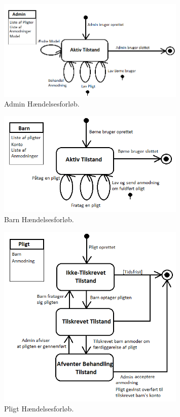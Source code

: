 \begin{figure}[H]
\centering
\includegraphics[width=0.8\textwidth]{Billeder/ForaelderForloeb.png}
\caption{Admin Hændelsesforløb.}
\label{ForaelderHaendelsesforloeb}
\end{figure}

\begin{figure}[H]
\centering
\includegraphics[width=0.8\textwidth]{Billeder/BoernForloeb.png}
\caption{Barn Hændelsesforløb.}
\label{BarnHaendelsesforloeb}
\end{figure}

\begin{figure}[H]
\centering
\includegraphics[width=0.8\textwidth]{Billeder/PligtForloeb.png}
\caption{Pligt Hændelsesforløb.}
\label{PligtHaendelsesforloeb}
\end{figure}

